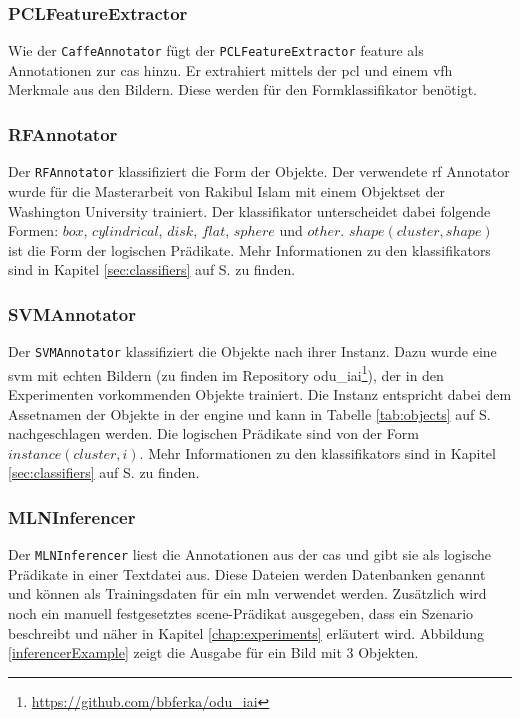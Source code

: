 \subsubsection{PCLFeatureExtractor}
Wie der \texttt{CaffeAnnotator} fügt der \texttt{PCLFeatureExtractor} \gls{feature} als Annotationen zur \gls{cas} hinzu. Er extrahiert mittels der \gls{pcl} und einem \gls{vfh} Merkmale aus den Bildern. Diese werden für den Formklassifikator benötigt.

\subsubsection{RFAnnotator}
Der \texttt{RFAnnotator} klassifiziert die Form der Objekte. Der verwendete \gls{rf} Annotator wurde für die Masterarbeit von Rakibul Islam \cite{rakib} mit einem Objektset der Washington University trainiert. Der \gls{klassifikator} unterscheidet dabei folgende Formen: $box$, $cylindrical$, $disk$, $flat$, $sphere$ und $other$. $shape(cluster, shape)$ ist die Form der logischen Prädikate. Mehr Informationen zu den \glspl{klassifikator} sind in Kapitel \ref{sec:classifiers} auf S. \pageref{sec:classifiers} zu finden.

\subsubsection{SVMAnnotator}
Der \texttt{SVMAnnotator} klassifiziert die Objekte nach ihrer Instanz. Dazu wurde eine \gls{svm} mit echten Bildern (zu finden im Repository odu\_iai\footnote{\url{https://github.com/bbferka/odu\_iai}}), der in den Experimenten vorkommenden Objekte trainiert. Die Instanz entspricht dabei dem Assetnamen der Objekte in der \acrshort{engine} und kann in Tabelle \ref{tab:objects} auf S.\pageref{tab:objects} nachgeschlagen werden. Die logischen Prädikate sind von der Form  $instance(cluster, i)$. Mehr Informationen zu den \glspl{klassifikator} sind in Kapitel \ref{sec:classifiers} auf S. \pageref{sec:classifiers} zu finden.

\subsubsection{MLNInferencer}
\label{sec:mlnInferencer}
Der \texttt{MLNInferencer} liest die Annotationen aus der \gls{cas} und gibt sie als logische Prädikate in einer Textdatei aus. Diese Dateien werden Datenbanken genannt und können als Trainingsdaten für ein \gls{mln} verwendet werden. Zusätzlich wird noch ein manuell festgesetztes scene-Prädikat ausgegeben, dass ein Szenario beschreibt und näher in Kapitel \ref{chap:experiments} erläutert wird. Abbildung \ref{inferencerExample} zeigt die Ausgabe für ein Bild mit 3 Objekten. 

